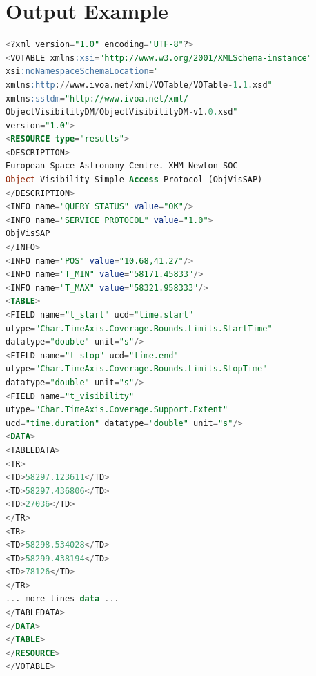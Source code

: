 \documentclass[11pt,a4paper]{ivoa}
\begin{document}
\section{Output Example}
\begin{lstlisting}[language=SQL]
<?xml version="1.0" encoding="UTF-8"?>
<VOTABLE xmlns:xsi="http://www.w3.org/2001/XMLSchema-instance"
xsi:noNamespaceSchemaLocation="
xmlns:http://www.ivoa.net/xml/VOTable/VOTable-1.1.xsd"
xmlns:ssldm="http://www.ivoa.net/xml/
ObjectVisibilityDM/ObjectVisibilityDM-v1.0.xsd"
version="1.0">
<RESOURCE type="results">
<DESCRIPTION>
European Space Astronomy Centre. XMM-Newton SOC -
Object Visibility Simple Access Protocol (ObjVisSAP)
</DESCRIPTION>
<INFO name="QUERY_STATUS" value="OK"/>
<INFO name="SERVICE PROTOCOL" value="1.0">
ObjVisSAP
</INFO>
<INFO name="POS" value="10.68,41.27"/>
<INFO name="T_MIN" value="58171.45833"/>
<INFO name="T_MAX" value="58321.958333"/>
<TABLE>
<FIELD name="t_start" ucd="time.start"
utype="Char.TimeAxis.Coverage.Bounds.Limits.StartTime"
datatype="double" unit="s"/>
<FIELD name="t_stop" ucd="time.end"
utype="Char.TimeAxis.Coverage.Bounds.Limits.StopTime"
datatype="double" unit="s"/>
<FIELD name="t_visibility"
utype="Char.TimeAxis.Coverage.Support.Extent"
ucd="time.duration" datatype="double" unit="s"/>
<DATA>
<TABLEDATA>
<TR>
<TD>58297.123611</TD>
<TD>58297.436806</TD>
<TD>27036</TD>
</TR>
<TR>
<TD>58298.534028</TD>
<TD>58299.438194</TD>
<TD>78126</TD>
</TR>
... more lines data ...
</TABLEDATA>
</DATA>
</TABLE>
</RESOURCE>
</VOTABLE>
\end{lstlisting}

\appendix
\renewcommand{\thesection}{\Alph{section}.\arabic{section}}
\setcounter{section}{0}
\end{document}
